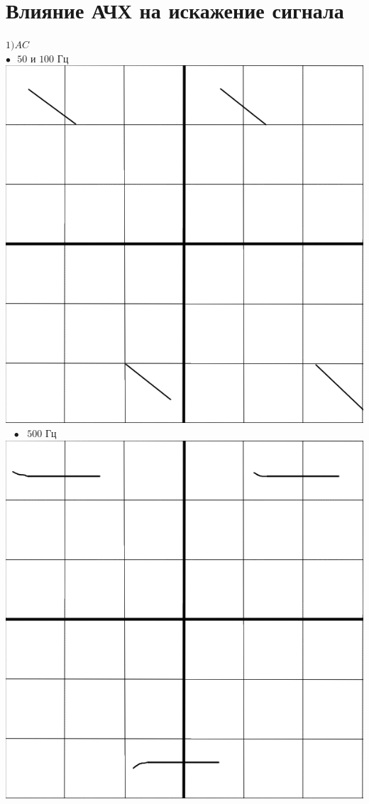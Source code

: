 \documentclass[a4paper,12pt]{article} %
\begin{document}
\section{Влияние АЧХ на искажение сигнала}
$1)AC$\\
$\bullet\text{ } 50 \text{ и }100\text{ Гц}$
\includegraphics[scale=0.28]{100,50}
$\text{   }\bullet\text{ } 500\text{ Гц}$
\includegraphics[scale=0.28]{500}\\
\end{document}

